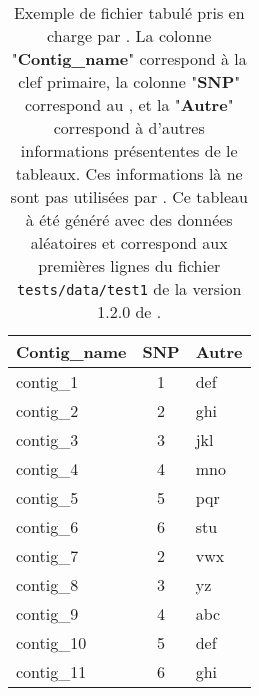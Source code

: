 \documentclass[../main]{subfiles} %
\begin{document}
\addto\extrasfrench{\protected\edef:{\unexpanded\expandafter{:}}}


\begin{table}[ht]
    \centering
    \begin{tabular}{lcl}
        \toprule
        \textbf{Contig\_name} & \textbf{SNP} & \textbf{Autre} \\
        \midrule
        contig\_1  & 1 & def  \\
        contig\_2  & 2 & ghi  \\
        contig\_3  & 3 & jkl  \\
        contig\_4  & 4 & mno  \\
        contig\_5  & 5 & pqr  \\
        contig\_6  & 6 & stu  \\
        contig\_7  & 2 & vwx  \\
        contig\_8  & 3 & yz   \\
        contig\_9  & 4 & abc  \\
        contig\_10 & 5 & def  \\
        contig\_11 & 6 & ghi  \\
        \bottomrule
    \end{tabular}
    \caption{Exemple de fichier tabulé pris en charge par \cite{snpheatmap}. La colonne "\textbf{Contig\_name}" correspond à la clef primaire, la colonne "\textbf{SNP}" correspond au \NbSNP, et la "\textbf{Autre}" correspond à d'autres informations présententes de le tableaux. Ces informations là ne sont pas utilisées par \cite{snpheatmap}. Ce tableau à été généré avec des données aléatoires et correspond aux premières lignes du fichier \lstinline{tests/data/test1} de la version 1.2.0 de \cite{snpheatmap}.}
    \label{tab:snpTable}
\end{table}
\end{document}

